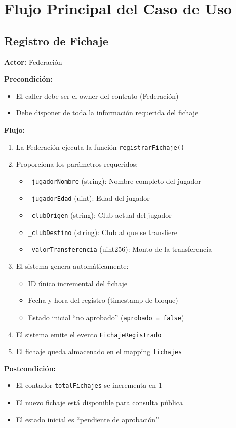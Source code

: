 \documentclass[12pt,a4paper]{article}
\begin{document}
	\section{Flujo Principal del Caso de Uso}
	
	\subsection{Registro de Fichaje}
	
	\begin{tcolorbox}[title=Registro de Fichaje,colback=blue!5!white]
		\textbf{Actor:} Federación
		
		\textbf{Precondición:}
		\begin{itemize}
			\item El caller debe ser el owner del contrato (Federación)
			\item Debe disponer de toda la información requerida del fichaje
		\end{itemize}
		
		\textbf{Flujo:}
		\begin{enumerate}
			\item La Federación ejecuta la función \texttt{registrarFichaje()}
			\item Proporciona los parámetros requeridos:
			\begin{itemize}
				\item \texttt{\_jugadorNombre} (string): Nombre completo del jugador
				\item \texttt{\_jugadorEdad} (uint): Edad del jugador
				\item \texttt{\_clubOrigen} (string): Club actual del jugador
				\item \texttt{\_clubDestino} (string): Club al que se transfiere
				\item \texttt{\_valorTransferencia} (uint256): Monto de la transferencia
			\end{itemize}
			\item El sistema genera automáticamente:
			\begin{itemize}
				\item ID único incremental del fichaje
				\item Fecha y hora del registro (timestamp de bloque)
				\item Estado inicial ``no aprobado'' (\texttt{aprobado = false})
			\end{itemize}
			\item El sistema emite el evento \texttt{FichajeRegistrado}
			\item El fichaje queda almacenado en el mapping \texttt{fichajes}
		\end{enumerate}
		
		\textbf{Postcondición:}
		\begin{itemize}
			\item El contador \texttt{totalFichajes} se incrementa en 1
			\item El nuevo fichaje está disponible para consulta pública
			\item El estado inicial es ``pendiente de aprobación''
		\end{itemize}
	\end{tcolorbox}
	
\end{document}
